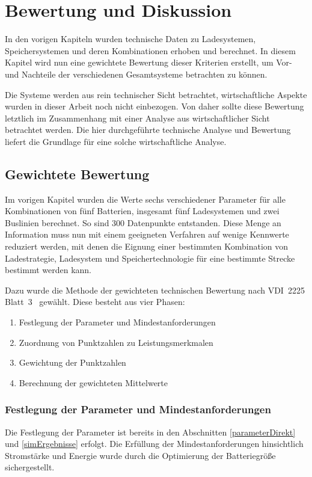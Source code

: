 \chapter{Bewertung und Diskussion} %
\label{chap5}
In den vorigen Kapiteln wurden technische Daten zu Ladesystemen, Speichersystemen und deren Kombinationen erhoben und berechnet. In diesem Kapitel wird nun eine gewichtete Bewertung dieser Kriterien erstellt, um Vor- und Nachteile der verschiedenen Gesamtsysteme betrachten zu können.

Die Systeme werden aus rein technischer Sicht betrachtet, wirtschaftliche Aspekte wurden in dieser Arbeit noch nicht einbezogen. Von daher sollte diese Bewertung letztlich im Zusammenhang mit einer Analyse aus wirtschaftlicher Sicht betrachtet werden. Die hier durchgeführte technische Analyse und Bewertung liefert die Grundlage für eine solche wirtschaftliche Analyse.

\section{Gewichtete Bewertung}
Im vorigen Kapitel wurden die Werte sechs verschiedener Parameter für alle Kombinationen von fünf Batterien, insgesamt fünf Ladesystemen und zwei Buslinien berechnet. So sind 300 Datenpunkte entstanden. Diese Menge an Information muss nun mit einem geeigneten Verfahren auf wenige Kennwerte reduziert werden, mit denen die Eignung einer bestimmten Kombination von Ladestrategie, Ladesystem und Speichertechnologie für eine bestimmte Strecke bestimmt werden kann.

Dazu wurde die Methode der gewichteten technischen Bewertung nach VDI~2225 Blatt~3~\cite{vdi:2225} gewählt. Diese besteht aus vier Phasen:
\begin{enumerate}
	\item Festlegung der Parameter und Mindestanforderungen
	\item Zuordnung von Punktzahlen zu Leistungsmerkmalen
	\item Gewichtung der Punktzahlen
	\item Berechnung der gewichteten Mittelwerte
\end{enumerate}

\subsection{Festlegung der Parameter und Mindestanforderungen}
Die Festlegung der Parameter ist bereits in den Abschnitten \ref{parameterDirekt} und \ref{simErgebnisse} erfolgt. Die Erfüllung der Mindestanforderungen hinsichtlich Stromstärke und Energie wurde durch die Optimierung der Batteriegröße sichergestellt.

